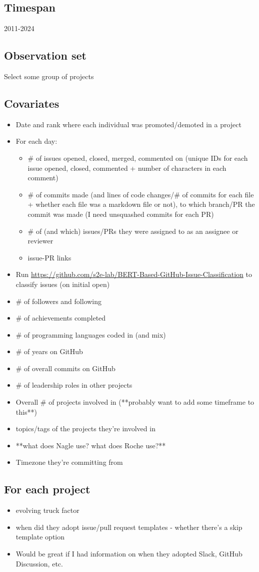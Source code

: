 \documentclass[12pt,notitlepage]{article}
\begin{document}
\subsection*{Timespan}
2011-2024

\subsection*{Observation set}
Select some group of projects

\subsection*{Covariates}
\begin{itemize}
    \item Date and rank where each individual was promoted/demoted in a project
    \item For each day:
    \begin{itemize}
        \item \# of issues opened, closed, merged, commented on (unique IDs for each issue opened, closed, commented + number of characters in each comment)
        \item \# of commits made (and lines of code changes/\# of commits for each file + whether each file was a markdown file or not), to which branch/PR the commit was made (I need unsquashed commits for each PR)
        \item \# of (and which) issues/PRs they were assigned to as an assignee or reviewer
        \item issue-PR links
    \end{itemize}
    \item Run \url{https://github.com/s2e-lab/BERT-Based-GitHub-Issue-Classification} to classify issues (on initial open)
    \item \# of followers and following
    \item \# of achievements completed
    \item \# of programming languages coded in (and mix)
    \item \# of years on GitHub
    \item \# of overall commits on GitHub
    \item \# of leadership roles in other projects
    \item Overall \# of projects involved in (**probably want to add some timeframe to this**)
    \item topics/tags of the projects they're involved in
    \item **what does Nagle use? what does Roche use?**
    \item Timezone they're committing from
\end{itemize}

\subsection*{For each project}
\begin{itemize}
    \item evolving truck factor
    \item when did they adopt issue/pull request templates - whether there's a skip template option
    \item Would be great if I had information on when they adopted Slack, GitHub Discussion, etc.
\end{itemize}
\end{document}
